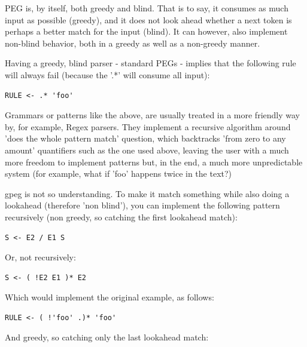 PEG is, by itself, both greedy and blind.
That is to say, it consumes as much input as possible (greedy), and it does not
look ahead whether a next token is perhaps a better match for the input (blind).
It can however, also implement non-blind behavior, both in a greedy as
well as a non-greedy manner.

Having a greedy, blind parser - standard PEGs - implies that the following
rule will always fail (because the '.*' will consume all input):

\begin{myquote}
\begin{verbatim}
RULE <- .* 'foo'
\end{verbatim}
\end{myquote}

Grammars or patterns like the above, are usually treated in a more
friendly way by, for example, Regex parsers. They implement
a recursive algorithm around 'does the whole pattern match' question,
which backtracks 'from zero to any amount' quantifiers such as the one
used above,
leaving the user with a much more freedom to implement patterns but,
in the end, a much more unpredictable system (for example, what if
'foo' happens twice in the text?)

gpeg is not so understanding. To make it match something while
also doing a lookahead (therefore 'non blind'),
you can implement the following pattern
recursively (non greedy, so catching the first lookahead match):

\begin{myquote}
\begin{verbatim}
S <- E2 / E1 S
\end{verbatim}
\end{myquote}

Or, not recursively:

\begin{myquote}
\begin{verbatim}
S <- ( !E2 E1 )* E2
\end{verbatim}
\end{myquote}

Which would implement the original example, as follows:

\begin{myquote}
\begin{verbatim}
RULE <- ( !'foo' .)* 'foo'
\end{verbatim}
\end{myquote}

And greedy, so catching only the last lookahead match:

